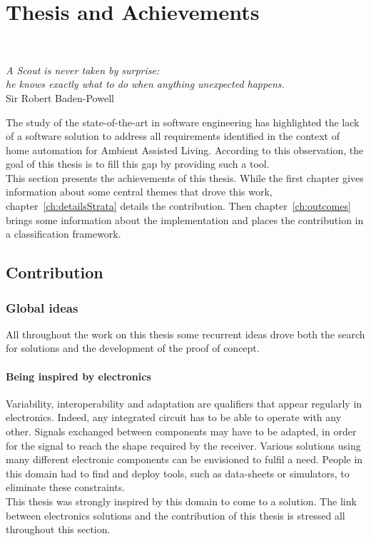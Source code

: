 \part{Thesis and Achievements}

~\vspace{1cm}
\begin{flushright}
{\it A Scout is never taken by surprise: \\
he knows exactly what to do when anything unexpected happens.} \\ 
Sir Robert Baden-Powell
\end{flushright}
\vspace{2cm}

The study of the state-of-the-art in software engineering has highlighted the lack of a software solution to address all requirements identified in the context of home automation for Ambient Assisted Living. According to this observation, the goal of this thesis is to fill this gap by providing such a tool.\\

This section presents the achievements of this thesis. While the first chapter gives information about some central themes that drove this work, chapter~\ref{ch:detailsStrata} details the contribution. Then chapter~\ref{ch:outcomes} brings some information about the implementation and places the contribution in a classification framework.

\chapter{Contribution}


\section{Global ideas}

All throughout the work on this thesis some recurrent ideas drove both the search for solutions and the development of the proof of concept.

\subsection{Being inspired by electronics}

Variability, interoperability and adaptation are qualifiers that appear regularly in electronics. Indeed, any integrated circuit has to be able to operate with any other. Signals exchanged between components may have to be adapted, in order for the signal to reach the shape required by the receiver. Various solutions using many different electronic components can be envisioned to fulfil a need. People in this domain had to find and deploy tools, such as data-sheets or simulators, to eliminate these constraints.\\
This thesis was strongly inspired by this domain to come to a solution. The link between electronics solutions and the contribution of this thesis is stressed all throughout this section.

